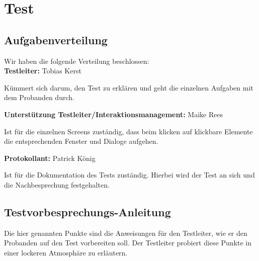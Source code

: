 \chapter{Test}
\label{chap:test}

\section{Aufgabenverteilung}

Wir haben die folgende Verteilung beschlossen:\\

\textbf{Testleiter:} Tobias Kerst

Kümmert sich darum, den Test zu erklären und geht die einzelnen Aufgaben mit dem Probanden durch.

\textbf{Unterstützung Testleiter/Interaktionsmanagement:} Maike Rees

Ist für die einzelnen Screens zuständig, dass beim klicken auf klickbare Elemente die entsprechenden Fenster und Dialoge aufgehen.

\textbf{Protokollant:} Patrick König

Ist für die Dokumentation des Tests zuständig. Hierbei wird der Test an sich und die Nachbesprechung festgehalten.

\section{Testvorbesprechungs-Anleitung}
\label{sec:testvorbesprechung}

Die hier genannten Punkte sind die Anweisungen für den Testleiter, wie er den Probanden auf den Test vorbereiten soll. Der Testleiter probiert diese Punkte in einer lockeren Atmosphäre zu erläutern.


